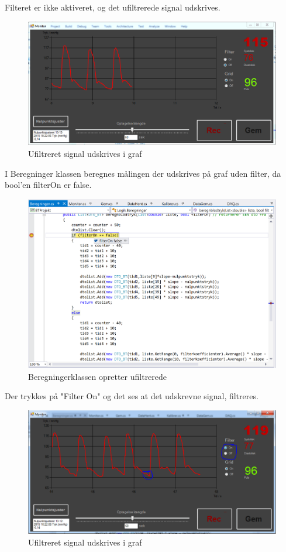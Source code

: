 Filteret er ikke aktiveret, og det ufiltrerede signal udskrives.

\begin{figure}[H]
	\centering
	\includegraphics[width=1\textwidth]{Figurer/Test_Aktiver_1}
	\caption{Ufiltreret signal udskrives i graf}
\end{figure}

I Beregninger klassen beregnes målingen der udskrives på graf uden filter, da bool'en filterOn er false.

\begin{figure}[H]
	\centering
	\includegraphics[width=1\textwidth]{Figurer/Test_Aktiver_2}
	\caption{Beregningerklassen opretter ufiltrerede}
\end{figure}

Der trykkes på "Filter On" og det ses at det udskrevne signal, filtreres.

\begin{figure}[H]
	\centering
	\includegraphics[width=1\textwidth]{Figurer/Test_Aktiver_3}
	\caption{Ufiltreret signal udskrives i graf}
\end{figure}

